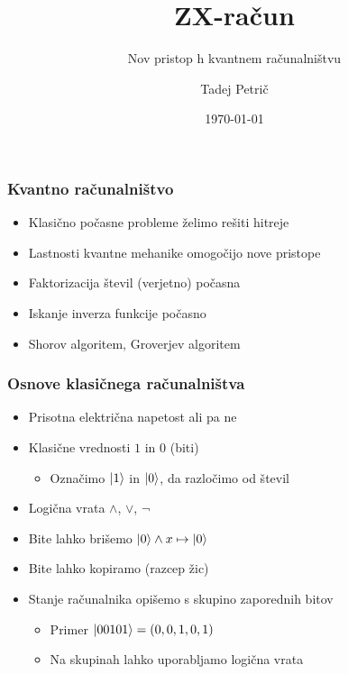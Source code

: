 \documentclass[10pt]{beamer}
\title{ZX-račun}
\subtitle{Nov pristop h kvantnem računalništvu}
\date{\today}
\author{Tadej Petrič}
\institute{Fakulteta za matematiko in fiziko}
\begin{document}
\begin{frame}
  \maketitle
\end{frame}
\begin{frame}
  \frametitle{Kvantno računalništvo}
  \begin{itemize}
  \item Klasično počasne probleme želimo rešiti hitreje
  \item Lastnosti kvantne mehanike omogočijo nove pristope
  \item Faktorizacija števil (verjetno) počasna
  \item Iskanje inverza funkcije počasno
  \pause\item Shorov algoritem, Groverjev algoritem
  \end{itemize}
\end{frame}
\begin{frame}
  \frametitle{Osnove klasičnega računalništva}
  \begin{itemize}
  \item Prisotna električna napetost ali pa ne
  \item Klasične vrednosti \(1\) in \(0\) (biti)
    \begin{itemize}
    \item Označimo \(\ket1\) in \(\ket0\), da razločimo od števil
    \end{itemize}
  \item Logična vrata \(\land\), \(\lor\), \(\lnot\)
  \item Bite lahko brišemo \(\ket0\land x \mapsto \ket0\)
  \item Bite lahko kopiramo (razcep žic)
  \item Stanje računalnika opišemo s skupino zaporednih bitov
    \begin{itemize}
    \item Primer \(\ket{00101} = (0,0,1,0,1)\)
    \item Na skupinah lahko uporabljamo logična vrata
    \end{itemize}
  \end{itemize}
\end{frame}
\end{document}
